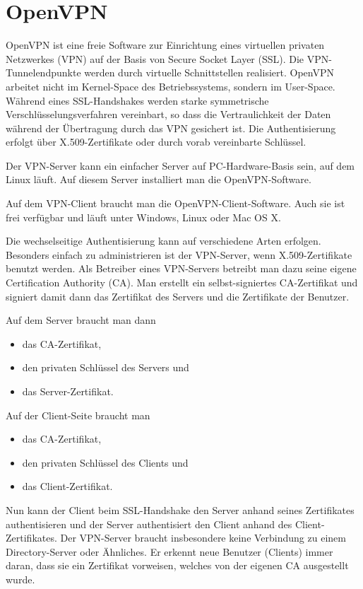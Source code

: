 \section{OpenVPN}
\label{sec:openvpn}

OpenVPN ist eine freie Software zur Einrichtung eines virtuellen privaten
Netz\-werk\-es (VPN) auf der Basis von Secure Socket Layer (SSL). Die
VPN-Tunnelendpunkte werden durch virtuelle Schnittstellen realisiert. OpenVPN
arbeitet nicht im Kernel-Space des Betriebssystems, sondern im
User-Space. Während eines SSL\hyp Handshakes werden starke symmetrische
Verschlüsselungsverfahren vereinbart, so dass die Vertraulichkeit der Daten
während der Übertragung durch das VPN gesichert ist. Die Authentisierung erfolgt
über X.509-Zertifikate oder durch vorab vereinbarte Schlüssel.

Der VPN-Server kann ein einfacher Server auf PC-Hardware-Basis sein, auf dem
\zB{} Linux läuft. Auf diesem Server installiert man die OpenVPN-Software.

Auf dem VPN-Client braucht man die OpenVPN-Client-Software. Auch sie ist frei
verfügbar und läuft unter Windows, Linux oder Mac OS X.

Die wechselseitige Authentisierung kann auf verschiedene Arten
erfolgen. Besonders einfach zu administrieren ist der VPN-Server, wenn
X.509-Zertifikate benutzt werden. Als Betreiber eines VPN-Servers betreibt man
dazu seine eigene Certification Authority (CA). Man erstellt ein
selbst-signiertes CA-Zertifikat und signiert damit dann das Zertifikat des
Servers und die Zertifikate der Benutzer.

Auf dem Server braucht man dann

\begin{itemize}
  \item das CA-Zertifikat,
  \item den privaten Schlüssel des Servers und
  \item das Server-Zertifikat.
\end{itemize}

Auf der Client-Seite braucht man

\begin{itemize}
  \item das CA-Zertifikat,
  \item den privaten Schlüssel des Clients und
  \item das Client-Zertifikat.
\end{itemize}

Nun kann der Client beim SSL-Handshake den Server anhand seines Zertifikates
authentisieren und der Server authentisiert den Client anhand des
Client-Zertifikates. Der VPN-Server braucht insbesondere keine Verbindung zu
einem Directory-Server oder Ähnliches. Er erkennt neue Benutzer (Clients) immer
daran, dass sie ein Zertifikat vorweisen, welches von der eigenen CA ausgestellt
wurde.

